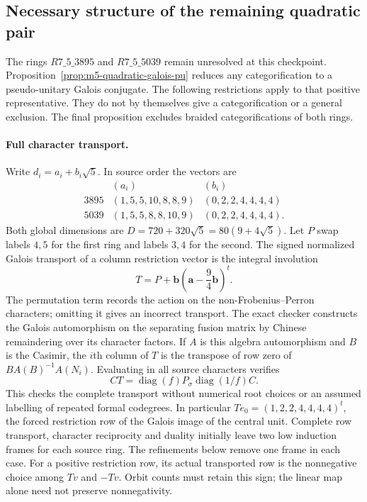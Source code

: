 \subsection{Necessary structure of the remaining quadratic pair}
\label{sec:m5-remaining-quadratic}
The rings $R7\_5\_3895$ and $R7\_5\_5039$ remain unresolved at
this checkpoint.  Proposition~\ref{prop:m5-quadratic-galois-pu} reduces
any categorification to a pseudo-unitary Galois conjugate.  The following
restrictions apply to that positive representative.  They do not by
themselves give a categorification or a general exclusion.  The final
proposition excludes braided categorifications of both rings.

\paragraph{Full character transport.}
Write $d_i=a_i+b_i\sqrt5$.  In source order the vectors are
\[
\begin{array}{c|l|l}
 & (a_i) & (b_i)\\\hline
3895&(1,5,5,10,8,8,9)&(0,2,2,4,4,4,4)\\
5039&(1,5,5,8,8,10,9)&(0,2,2,4,4,4,4).
\end{array}
\]
Both global dimensions are
$D=720+320\sqrt5=80(9+4\sqrt5)$.
Let $P$ swap labels $4,5$ for the first ring and labels $3,4$ for
the second.  The signed normalized Galois transport of a column restriction
vector is the integral involution
\begin{equation}\label{eq:m5-q5-transport}
 T=P+\mathbf b\left(\mathbf a-\frac94\mathbf b\right)^{\!t}.
\end{equation}
The permutation term records the action on the non-Frobenius--Perron
characters; omitting it gives an incorrect transport.  The exact checker
constructs the Galois automorphism on the separating fusion matrix by
Chinese remaindering over its character factors.  If $A$ is this algebra
automorphism and $B$ is the Casimir, the $i$th column of $T$ is the
transpose of row zero of $B A(B)^{-1}A(N_i)$.  Evaluating in all source
characters verifies
\[
 CT=\operatorname{diag}(f)P_\sigma\operatorname{diag}(1/f)C.
\]
This checks the complete transport without numerical root choices or
an assumed labelling of repeated formal codegrees.  In particular
$Te_0=(1,2,2,4,4,4,4)^t$, the forced restriction row of the Galois
image of the central unit.  Complete row transport, character reciprocity
and duality initially leave two low induction frames for each source ring.
The refinements below remove one frame in each case.
For a positive restriction row, its actual transported row is the
nonnegative choice among $Tv$ and $-Tv$.  Orbit counts must retain
this sign; the linear map alone need not preserve nonnegativity.

